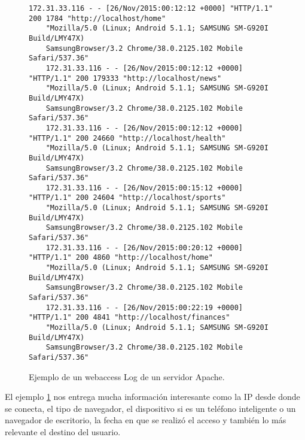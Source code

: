 \begin{figure}[h]%
	\centering
	
	\begin{lstlisting}[frame=single,basicstyle=\ttfamily\tiny,]
	172.31.33.116 - - [26/Nov/2015:00:12:12 +0000] "HTTP/1.1" 200 1784 "http://localhost/home" 
	"Mozilla/5.0 (Linux; Android 5.1.1; SAMSUNG SM-G920I Build/LMY47X) 
	SamsungBrowser/3.2 Chrome/38.0.2125.102 Mobile Safari/537.36"
	172.31.33.116 - - [26/Nov/2015:00:12:12 +0000] "HTTP/1.1" 200 179333 "http://localhost/news" 
	"Mozilla/5.0 (Linux; Android 5.1.1; SAMSUNG SM-G920I Build/LMY47X) 
	SamsungBrowser/3.2 Chrome/38.0.2125.102 Mobile Safari/537.36"
	172.31.33.116 - - [26/Nov/2015:00:12:12 +0000] "HTTP/1.1" 200 24660 "http://localhost/health" 
	"Mozilla/5.0 (Linux; Android 5.1.1; SAMSUNG SM-G920I Build/LMY47X) 
	SamsungBrowser/3.2 Chrome/38.0.2125.102 Mobile Safari/537.36"
	172.31.33.116 - - [26/Nov/2015:00:15:12 +0000] "HTTP/1.1" 200 24604 "http://localhost/sports" 
	"Mozilla/5.0 (Linux; Android 5.1.1; SAMSUNG SM-G920I Build/LMY47X) 
	SamsungBrowser/3.2 Chrome/38.0.2125.102 Mobile Safari/537.36"
	172.31.33.116 - - [26/Nov/2015:00:20:12 +0000] "HTTP/1.1" 200 4860 "http://localhost/home" 
	"Mozilla/5.0 (Linux; Android 5.1.1; SAMSUNG SM-G920I Build/LMY47X) 
	SamsungBrowser/3.2 Chrome/38.0.2125.102 Mobile Safari/537.36"
	172.31.33.116 - - [26/Nov/2015:00:22:19 +0000] "HTTP/1.1" 200 4841 "http://localhost/finances" 
	"Mozilla/5.0 (Linux; Android 5.1.1; SAMSUNG SM-G920I Build/LMY47X) 
	SamsungBrowser/3.2 Chrome/38.0.2125.102 Mobile Safari/537.36"
	\end{lstlisting}
	
	
	
	\caption{Ejemplo de un webaccess Log de un servidor Apache.}
	\label{fig:accesslog-apache-teleton}
\end{figure}




  El ejemplo \ref{fig:accesslog-apache-teleton} nos entrega mucha información interesante como la {IP} desde donde se conecta, el tipo de navegador, el dispositivo si es un teléfono inteligente o un navegador de escritorio, la fecha en que se realizó el acceso y también lo más relevante el destino del usuario.
  
  
  
  